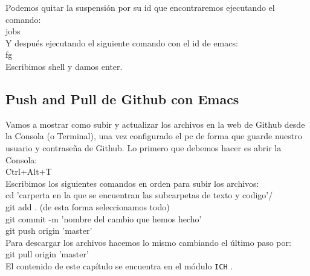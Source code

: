 Podemos quitar la suspensión por su id que encontraremos ejecutando el comando:\\

jobs\\

Y después ejecutando el siguiente comando con el id de emacs:\\

fg\\

Escribimos shell y damos enter. \\


\subsection{Push and Pull de Github con Emacs}

Vamos a mostrar como subir y actualizar los archivos en la web de Github desde la Consola (o Terminal), una vez configurado el pc de forma que guarde nuestro usuario y contraseña de Github. Lo primero que debemos hacer es abrir la Consola:\\

Ctrl+Alt+T\\

Escribimos los siguientes comandos en orden para subir los archivos:\\

cd 'carperta en la que se encuentran las subcarpetas de texto y codigo'/ \\

git add .  (de esta forma seleccionamos todo)\\

git commit -m 'nombre del cambio que hemos hecho'\\

git push origin 'master'\\


Para descargar los archivos hacemos lo mismo cambiando el último paso por:\\

git pull origin 'master'\\




El contenido de este capítulo se encuentra en el módulo \texttt{ICH} 
.

